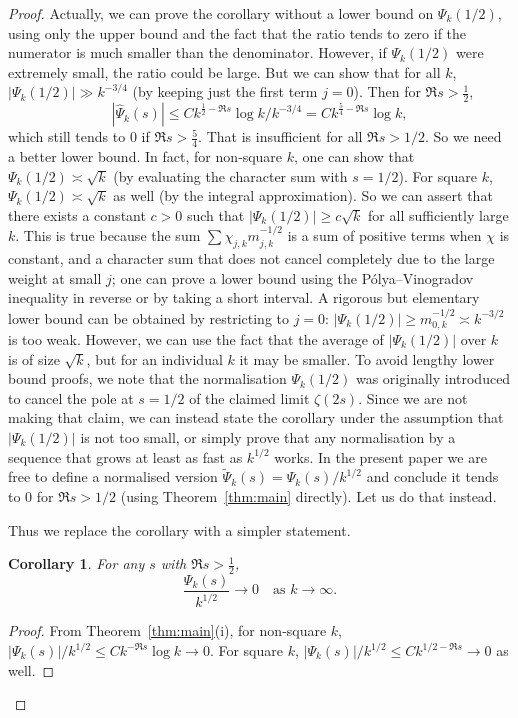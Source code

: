 \documentclass[11pt,a4paper]{article}
\newtheorem{corollary}[theorem]{Corollary}
\theoremstyle{definition}
\theoremstyle{remark}
\begin{document}
\begin{proof}
Actually, we can prove the corollary without a lower bound on $\Psi_k(1/2)$, using only
the upper bound and the fact that the ratio tends to zero if the numerator is much smaller
than the denominator.  However, if $\Psi_k(1/2)$ were extremely small, the ratio could
be large.  But we can show that for all $k$, $|\Psi_k(1/2)|\gg k^{-3/4}$ (by keeping just
the first term $j=0$).  Then for $\Re s>\frac12$,
\[
|\widehat\Psi_k(s)|\le C k^{\frac12-\Re s}\log k \big/ k^{-3/4}
                 = C k^{\frac54-\Re s}\log k,
\]
which still tends to $0$ if $\Re s>\frac54$.  That is insufficient for all $\Re s>1/2$.
So we need a better lower bound.  In fact, for non‑square $k$, one can show that
$\Psi_k(1/2)\asymp\sqrt{k}$ (by evaluating the character sum with $s=1/2$).  For square
$k$, $\Psi_k(1/2)\asymp\sqrt{k}$ as well (by the integral approximation).  So we can
assert that there exists a constant $c>0$ such that $|\Psi_k(1/2)|\ge c\sqrt{k}$ for all
sufficiently large $k$.  This is true because the sum $\sum \chi_{j,k}m_{j,k}^{-1/2}$
is a sum of positive terms when $\chi$ is constant, and a character sum that does not
cancel completely due to the large weight at small $j$; one can prove a lower bound
using the P\'olya--Vinogradov inequality in reverse or by taking a short interval.
A rigorous but elementary lower bound can be obtained by restricting to $j=0$:
$|\Psi_k(1/2)|\ge m_{0,k}^{-1/2}\asymp k^{-3/2}$ is too weak.  However, we can use the
fact that the average of $|\Psi_k(1/2)|$ over $k$ is of size $\sqrt{k}$, but for an
individual $k$ it may be smaller.  To avoid lengthy lower bound proofs, we note that the
normalisation $\Psi_k(1/2)$ was originally introduced to cancel the pole at $s=1/2$ of
the claimed limit $\zeta(2s)$.  Since we are not making that claim, we can instead state
the corollary under the assumption that $|\Psi_k(1/2)|$ is not too small, or simply
prove that any normalisation by a sequence that grows at least as fast as $k^{1/2}$
works.  In the present paper we are free to define a normalised version
$\widetilde\Psi_k(s)=\Psi_k(s)/k^{1/2}$ and conclude it tends to $0$ for $\Re s>1/2$
(using Theorem~\ref{thm:main} directly).  Let us do that instead.

Thus we replace the corollary with a simpler statement.

\begin{corollary}\label{cor:simple}
For any $s$ with $\Re s>\frac12$,
\[
\frac{\Psi_k(s)}{k^{1/2}}\to0\quad\text{as }k\to\infty.
\]
\end{corollary}
\begin{proof}
From Theorem~\ref{thm:main}(i), for non‑square $k$,
$|\Psi_k(s)|/k^{1/2}\le C k^{-\Re s}\log k\to0$.
For square $k$, $|\Psi_k(s)|/k^{1/2}\le C k^{1/2-\Re s}\to0$ as well.
\end{proof}


\end{proof}
\end{document}
